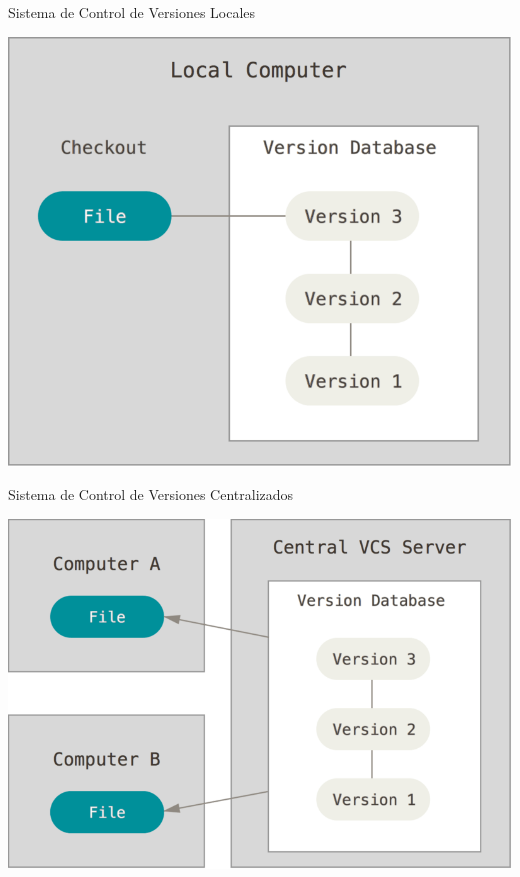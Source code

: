 \begin{frame}[c]{Sistema de Control de Versiones Locales}
    \begin{center}
        \includegraphics[scale=0.25]{img/scv-local.png}
    \end{center}
\end{frame}

\begin{frame}[c]{Sistema de Control de Versiones Centralizados}
    \begin{center}
        \includegraphics[scale=0.3]{img/scv-centralized.png}
    \end{center}
\end{frame}

